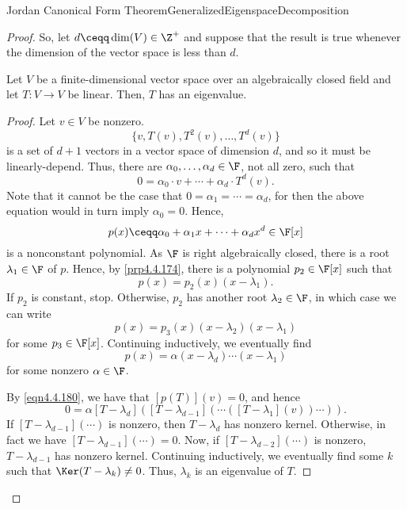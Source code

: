 \begin{thm}{Jordan Canonical Form Theorem}{GeneralizedEigenspaceDecomposition}
\begin{proof}
		So, let $d\ceqq \dim (V)\in \Z ^+$ and suppose that the result is true whenever the dimension of the vector space is less than $d$.
		\begin{lma}[break at=19cm/0pt]{}{}
			Let $V$ be a finite-dimensional vector space over an algebraically closed field and let $T\colon V\rightarrow V$ be linear.  Then, $T$ has an eigenvalue.
			\begin{proof}
				Let $v\in V$ be nonzero.
				\begin{equation}
				\{ v,T(v),T^2(v),\ldots ,T^d(v)\}
				\end{equation}
				is a set of $d+1$ vectors in a vector space of dimension $d$, and so it must be linearly-depend.  Thus, there are $\alpha _0,\ldots ,\alpha _d\in \F$, not all zero, such that
				\begin{equation}\label{eqn4.4.180}
				0=\alpha _0\cdot v+\cdots +\alpha _d\cdot T^d(v).
				\end{equation}
				Note that it cannot be the case that $0=\alpha _1=\cdots =\alpha _d$, for then the above equation would in turn imply $\alpha _0=0$.  Hence,
				\begin{equation}
					p(x)\ceqq \alpha _0+\alpha _1x+\cdots +\alpha _dx^d\in \F [x]
				\end{equation}
				is a nonconstant polynomial.  As $\F$ is right algebraically closed, there is a root $\lambda _1\in \F$ of $p$.  Hence, by \cref{prp4.4.174}, there is a polynomial $p_2\in \F [x]$ such that
				\begin{equation}
					p(x)=p_2(x)(x-\lambda _1).
				\end{equation}
				If $p_2$ is constant, stop.  Otherwise, $p_2$ has another root $\lambda _2\in \F$, in which case we can write
				\begin{equation}
					p(x)=p_3(x)(x-\lambda _2)(x-\lambda _1)
				\end{equation}
				for some $p_3\in \F [x]$.  Continuing inductively, we eventually find
				\begin{equation}
					p(x)=\alpha (x-\lambda _d)\cdots (x-\lambda _1)
				\end{equation}
				for some nonzero $\alpha \in \F$.
				
				By \eqref{eqn4.4.180}, we have that $[p(T)](v)=0$, and hence
				\begin{equation}
					0=\alpha [T-\lambda _d]\left( [T-\lambda _{d-1}]\left( \cdots ([T-\lambda _1](v))\cdots \right) \right) .
				\end{equation}
				If $[T-\lambda _{d-1}](\cdots )$ is nonzero, then $T-\lambda _d$ has nonzero kernel.  Otherwise, in fact we have $[T-\lambda _{d-1}](\cdots )=0$.  Now, if $[T-\lambda _{d-2}](\cdots )$ is nonzero, $T-\lambda _{d-1}$ has nonzero kernel.  Continuing inductively, we eventually find some $k$ such that $\Ker (T-\lambda _k)\neq 0$.  Thus, $\lambda _k$ is an eigenvalue of $T$.
			\end{proof}
		\end{lma}
	

\end{proof}
\end{thm}
